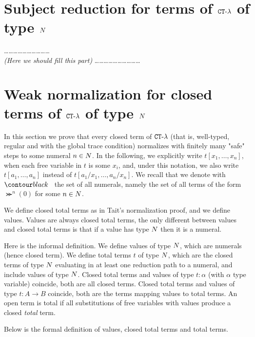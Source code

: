 \documentclass{article}
\begin{document}
\section{Subject reduction for terms of ${ {\tt CT}\mbox{-}\lambda}$ of type ${N}$}
\ldots\ldots\ldots\ldots\ldots\ldots\ldots\ldots\ldots\ldots
\\
\emph{(Here we should fill this part)}
\ldots\ldots\ldots\ldots\ldots\ldots\ldots\ldots\ldots\ldots



\section{Weak normalization for closed terms of ${ {\tt CT}\mbox{-}\lambda}$ of type ${N}$}
\label{section-weak-normalization}
In this section we prove that every closed term of ${ {\tt CT}\mbox{-}\lambda}$
 (that is, well-typed, regular and with the global trace condition) normalizes with finitely many "safe" steps
to some numeral $n \in {N}$.
In the following, we explicitly write $t[x_1,\ldots,x_n]$,
when each free variable in $t$ is some $x_i$, 
and, under this notation, we also write $t[a_1,\ldots,a_n]$ instead of $t[a_1/x_1,\ldots,a_n/x_n]$. 
We recall that we denote with $\Nat$ the set of all numerals, namely the set of all terms of the form
$\Succ^n(0)$ for some $n\in {N}$.

We define closed total terms as in Tait's normalization proof, and we define values.
Values are always closed total terms,
the only different between values and closed total terms 
is that if a value has type ${N}$ then it is a numeral.

Here is the informal definition. We define values of type ${N}$, which are numerals (hence closed term). 
We define total terms $t$ of type ${N}$, which are
the closed terms of type ${N}$ evaluating in at least one reduction path to a numeral, and
include values of type ${N}$. 
Closed total terms and values of type $t:\alpha$ (with $\alpha$ type variable) coincide, 
both are all closed terms.
Closed total terms and values of type $t:A \rightarrow B$ coincide, 
both are the terms mapping values to total terms. 
An open term is total if all substitutions of free variables with values produce a closed \emph{total} term.

Below is the formal definition of values, closed total terms and total terms.
\end{document}
